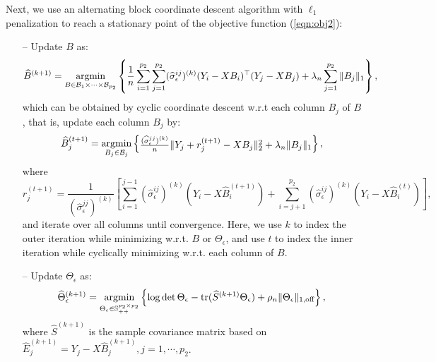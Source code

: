 Next, we use an alternating block coordinate descent algorithm with $\ell_1$ penalization to reach a stationary point of the objective function (\ref{eqn:obj2}):
\begin{itemize}
\setlength{\itemsep}{0.2pt}
\item[--] Update $B$ as:
\begin{equation}\label{eqn:updateB}
\widehat{B}^{(k+1)} = \mathop{\text{argmin}}\limits_{B\in \mathcal{B}_1\times \cdots\times \mathcal{B}_{p_2}} \left\{ \frac{1}{n}\sum_{i=1}^{p_2}\sum_{j=1}^{p_2}(\widehat{\sigma}_{\epsilon}^{ij})^{(k)}(Y_i-XB_i)^\top (Y_j - XB_j) + \lambda_n\sum_{j=1}^{p_2}\|B_j\|_1 \right\},
\end{equation}
which can be obtained by cyclic coordinate descent w.r.t each column $B_j$ of $B$, that is, update each column $B_j$ by: 
\begin{equation}\label{eqn:Bjunrestricted}
\widehat{B}_j^{(t+1)} = \mathop{\text{argmin}}\limits_{B_j\in\mathcal{B}_j} \begin{Bmatrix} \frac{(\widehat{\sigma}^{jj}_\epsilon)^{(k)}}{n}\|Y_j+r_j^{{(t+1)}}-XB_j\|_2^2 + \lambda_n\|B_j\|_1 \end{Bmatrix},
\end{equation}
 where 
$$r_j^{(t+1)} = \frac{1}{(\widehat{\sigma}^{jj}_\epsilon)^{(k)}}\left[ \sum_{i=1}^{j-1} (\widehat{\sigma}^{ij}_\epsilon)^{(k)}(Y_i-X\widehat{B}_i^{(t+1)}) + \sum_{i=j+1}^{p_2} (\widehat{\sigma}^{ij}_\epsilon)^{(k)} (Y_i-X\widehat{B}_i^{(t)})\right],$$
and iterate over all columns until convergence. Here, we use $k$ to index the outer iteration while minimizing w.r.t. $B$ or $\Theta_\epsilon$, and use $t$ to index the inner iteration while cyclically minimizing w.r.t. each column of $B$. 
\item[--] Update  $\Theta_\epsilon$ as:
\begin{equation}\label{eqn:updateTheta}
 \widehat{\Theta}_\epsilon^{(k+1)} = \mathop{\text{argmin}}\limits_{\Theta_\epsilon\in\mathbb{S}_{++}^{p_2\times p_2}} \left\{
 \log\det\Theta_\epsilon - \text{tr}(\widehat{S}^{(k+1)}\Theta_\epsilon) + \rho_n\|\Theta_\epsilon\|_{1,\text{off}}
 \right\},
 \end{equation}
 where $\widehat{S}^{(k+1)}$ is the sample covariance matrix based on $\widehat{E}^{(k+1)}_j = Y_j - X\widehat{B}_j^{(k+1)},j=1,\cdots,p_2$.
\end{itemize}


